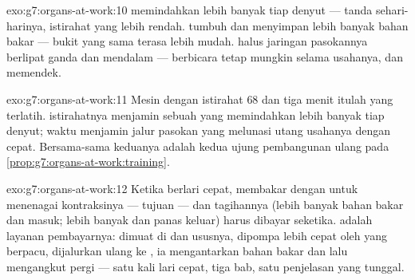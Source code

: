 \begin{solution}{exo:g7:organs-at-work:10}
 memindahkan lebih banyak  tiap denyut --- tanda
sehari-harinya,  istirahat yang lebih rendah. 
tumbuh dan menyimpan lebih banyak bahan bakar --- bukit yang sama
terasa lebih mudah.  halus jaringan pasokannya berlipat ganda
dan  mendalam --- berbicara tetap mungkin selama
usahanya, dan  memendek.
\end{solution}

\begin{solution}{exo:g7:organs-at-work:11}
Mesin dengan istirahat $68$ dan  tiga menit itulah yang
terlatih.  istirahatnya menjamin sebuah  yang
memindahkan lebih banyak tiap denyut; waktu  menjamin
jalur pasokan yang melunasi utang usahanya dengan cepat. Bersama-sama
keduanya adalah kedua ujung pembangunan ulang pada
\cref{prop:g7:organs-at-work:training}.
\end{solution}

\begin{solution}{exo:g7:organs-at-work:12}
Ketika berlari cepat,    membakar  dengan
 untuk menenagai kontraksinya --- tujuan  --- dan
tagihannya (lebih banyak bahan bakar dan  masuk; lebih banyak
 dan panas keluar) harus dibayar seketika. 
adalah layanan pembayarnya: dimuat di  dan ususnya, dipompa
lebih cepat oleh  yang berpacu, dijalurkan ulang ke ,
ia mengantarkan bahan bakar dan  lalu mengangkut pergi
 --- satu kali lari cepat, tiga bab, satu penjelasan
yang tunggal.
\end{solution}

